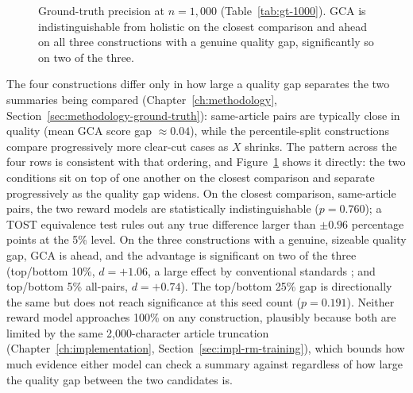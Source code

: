 \begin{figure}[htbp]
\centering
{}
\caption[Ground-truth precision at $n=1{,}000$, four constructions]{Ground-truth precision at $n=1{,}000$ (Table~\ref{tab:gt-1000}).
GCA is indistinguishable from holistic on the closest comparison and ahead on
all three constructions with a genuine quality gap, significantly so on two
of the three.}
\label{fig:gt-1000-bars}
\end{figure}

The four constructions differ only in how large a quality gap separates the
two summaries being compared (Chapter~\ref{ch:methodology},
Section~\ref{sec:methodology-ground-truth}):
same-article pairs are typically close in quality (mean GCA score gap
$\approx0.04$), while the percentile-split constructions compare
progressively more clear-cut cases as $X$ shrinks. The pattern across the
four rows is consistent with that ordering, and
Figure~\ref{fig:gt-1000-bars} shows it directly: the two conditions sit on
top of one another on the closest comparison and separate progressively as
the quality gap widens. On the closest comparison,
same-article pairs, the two reward models are statistically
indistinguishable ($p=0.760$); a TOST equivalence test rules out any true
difference larger than $\pm0.96$ percentage points at the 5\% level. On the
three constructions with a genuine, sizeable quality gap, GCA is ahead, and
the advantage is significant on two of the three (top/bottom 10\%, $d=+1.06$,
a large effect by conventional standards \citep{cohen1988statistical}; and
top/bottom 5\% all-pairs, $d=+0.74$). The top/bottom 25\% gap is directionally
the same but does not reach significance at this seed count ($p=0.191$).
Neither reward model approaches 100\% on any construction, plausibly because
both are limited by the same 2{,}000-character article truncation
(Chapter~\ref{ch:implementation}, Section~\ref{sec:impl-rm-training}), which
bounds how much evidence either model can check a summary against regardless
of how large the quality gap between the two candidates is.

